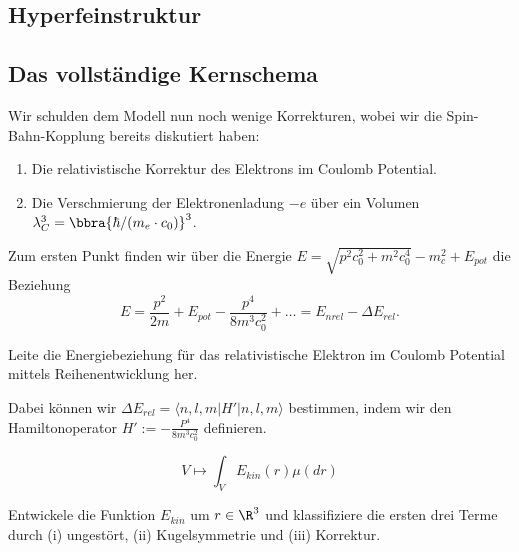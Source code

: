 \documentclass{subfiles}
\begin{document}

    \subsection{Hyperfeinstruktur}  


    \subsection{Das vollständige Kernschema}
        Wir schulden dem Modell nun noch wenige Korrekturen, wobei wir die Spin-Bahn-Kopplung bereits diskutiert haben:
        \begin{enumerate}[label=(\roman*)]
            \item Die relativistische Korrektur des Elektrons im Coulomb Potential.
            \item Die Verschmierung der Elektronenladung $-e$ über ein Volumen $\lambda_C^3 = \bbra{\hbar/(m_e\cdot c_0)}^3$.
        \end{enumerate}
        Zum ersten Punkt finden wir über die Energie $E = \sqrt{p^2c_0^2 + m^2c_0^4} - m_c^2 + E_\textit{pot}$ die Beziehung
        \[
            E = \frac{p^2}{2m} + E_\textit{pot} - \frac{p^4}{8m^3c_0^2} + \ldots = E_\textit{nrel} - \Delta E_\textit{rel}.
        \]
        \begin{Aufgabe}
            \nr{} Leite die Energiebeziehung für das relativistische Elektron im Coulomb Potential mittels Reihenentwicklung her. 
        \end{Aufgabe}
        Dabei können wir $\Delta E_\textit{rel} = \langle n,l,m|H'|n,l,m\rangle$ bestimmen, indem wir den Hamiltonoperator $H' :=- \frac{P^4}{8m^3c_0^2}$ definieren. 
        
        \[
            V\mapsto\int_V E_\textit{kin}(r)\mu(dr)
        \]
        \begin{Aufgabe}
            \nr{} Entwickele die Funktion $E_\textit{kin}$ um $r\in\R^3$ und klassifiziere die ersten drei Terme durch (i) ungestört, (ii) Kugelsymmetrie und (iii) Korrektur. 
        \end{Aufgabe}
\end{document}
